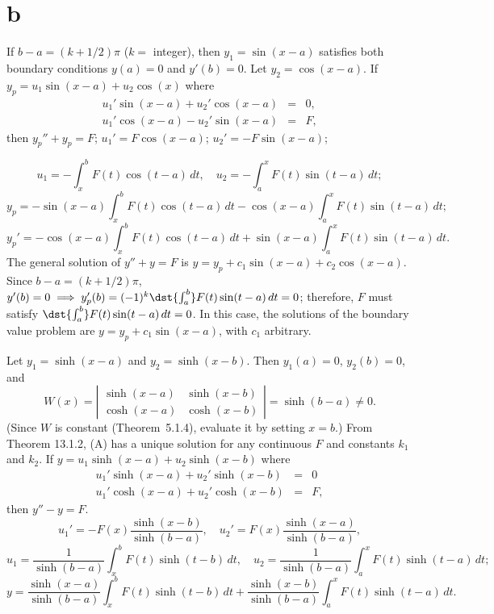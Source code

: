 \documentclass[dvips]{book}
\renewcommand{\exer}[1]{\par\medskip\;\noindent{\color{red}\bf #1.}}
\numberwithin{example}{section}
\numberwithin{equation}{section}
\numberwithin{theorem}{section}
\numberwithin{table}{section}
\numberwithin{figure}{section}
\begin{document}
\part{b} If $b-a=(k+1/2)\pi$  ($k=$ integer), then
$y_{1}=\sin(x-a)$ satisfies both boundary conditions $y(a)=0$
and $y'(b)=0$. Let $y_{2}=\cos(x-a)$. If
$y_{p}=u_{1}\sin(x-a)+u_{2}\cos(x)$   where
\begin{eqnarray*}
u_{1}'\sin(x-a)+u_{2}'\cos(x-a)&=&0,\\
u_{1}'\cos(x-a)-u_{2}'\sin(x-a)&=&F,
\end{eqnarray*}
then $y_{p}''+y_{p}=F$; $u_{1}'=F\cos(x-a)$; $u_{2}'=-F\sin(x-a)$;

$$
u_{1}=-\int_{x}^{b}F(t)\cos(t-a)\,dt, \quad
u_{2}=-\int_{a}^{x}F(t)\sin(t-a)\,dt;
$$
$$
y_{p}=-\sin(x-a)\int_{x}^{b}F(t)\cos(t-a)\,dt
-\cos(x-a)\int_{a}^{x} F(t)\sin(t-a)\,dt;
$$
$$
y_{p}'=-\cos(x-a)\int_{x}^{b}F(t)\cos(t-a)\,dt
+\sin(x-a)\int_{a}^{x}F(t)\sin(t-a)\,dt.
$$
The general solution of $y''+y=F$  is
$y=y_{p}+c_{1}\sin(x-a)+c_{2}\cos(x-a)$.  Since $b-a=(k+1/2)\pi$,
$y'(b)=0\implies y_{p}'(b)=(-1)^{k}\dst{\int_{a}^{b}}F(t)\sin(t-a)\,dt=0$;
therefore, $F$ must satisfy $\dst{\int_{a}^{b}}F(t)\sin(t-a)\,dt=0$.
In this case, the solutions of the boundary value problem are
$y=y_{p}+c_{1}\sin(x-a)$, with $c_{1}$ arbitrary.


\exer{13.1.12}
Let $y_{1}=\sinh(x-a)$  and $y_{2}=\sinh(x-b)$. Then
$y_{1}(a)=0$, $y_{2}(b)=0$, and
$$
W(x)=\left|\begin{array}{ccccccc}
\sinh(x-a)&\sinh(x-b)\\\cosh(x-a)&\cosh(x-b)
\end{array}\right|=\sinh(b-a)\ne0.
$$
(Since $W$ is constant (Theorem~5.1.4), evaluate it by
setting $x=b$.) From Theorem 13.1.2,  (A) has a unique solution
for any continuous $F$  and constants $k_{1}$ and $k_{2}$.
If $y=u_{1}\sinh(x-a)+u_{2}\sinh(x-b)$ where
\begin{eqnarray*}
u_{1}'\sinh(x-a)+u_{2}'\sinh(x-b)&=&0 \\
u_{1}'\cosh(x-a)+u_{2}'\cosh(x-b)&=&F,
\end{eqnarray*}
then $y''-y=F$.
$$
u_{1}'=-F(x)\frac{\sinh(x-b)}{\sinh(b-a)}, \quad
u_{2}'=F(x)\frac{\sinh(x-a)}{\sinh(b-a)},
$$
$$
u_{1}=\frac{1}{\sinh(b-a)}\int_{x}^{b}F(t)\sinh(t-b)\,dt,\quad
u_{2}=\frac{1}{\sinh(b-a)}\int_{a}^{x}F(t)\sinh(t-a)\,dt;
$$
$$
y=\frac{\sinh(x-a)}{\sinh(b-a)}\int_{x}^{b}F(t)\sinh(t-b)\,dt+
\frac{\sinh(x-b)}{\sinh(b-a)}\int_{a}^{x}F(t)\sinh(t-a)\,dt.
$$
\end{document}

